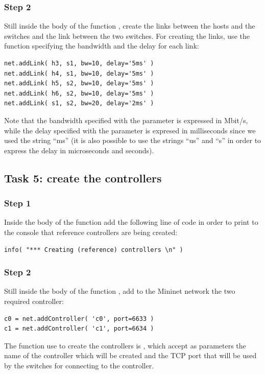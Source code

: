 \subsubsection*{Step 2}
Still inside the body of the function , create the
links between the hosts and the switches and the link between the two switches.
For creating the links, use the function  specifying the bandwidth
and the delay for each link:
\begin{lstlisting}
net.addLink( h3, s1, bw=10, delay='5ms' )
net.addLink( h4, s1, bw=10, delay='5ms' )
net.addLink( h5, s2, bw=10, delay='5ms' )
net.addLink( h6, s2, bw=10, delay='5ms' )
net.addLink( s1, s2, bw=20, delay='2ms' )
\end{lstlisting}
Note that the bandwidth specified with the parameter  is expressed in
Mbit/s, while the delay specified with the parameter  is expresed
in milliseconds since we used the string ``ms'' (it is also possible to use
the strings ``us'' and ``s'' in order to express the delay in microseconds and
seconds).





\subsection*{Task 5: create the controllers}
\subsubsection*{Step 1}
Inside the body of the function  add the following line
of code in order to print to the console that reference controllers are being created:
\begin{lstlisting}
info( "*** Creating (reference) controllers \n" )
\end{lstlisting}

\subsubsection*{Step 2}
Still inside the body of the function , add to the
Mininet network the two required controller:
\begin{lstlisting}
c0 = net.addController( 'c0', port=6633 )
c1 = net.addController( 'c1', port=6634 )
\end{lstlisting}

The function use to create the controllers is , which accept
as parameters the name of the controller which will be created and the TCP port that
will be used by the switches for connecting to the controller.







